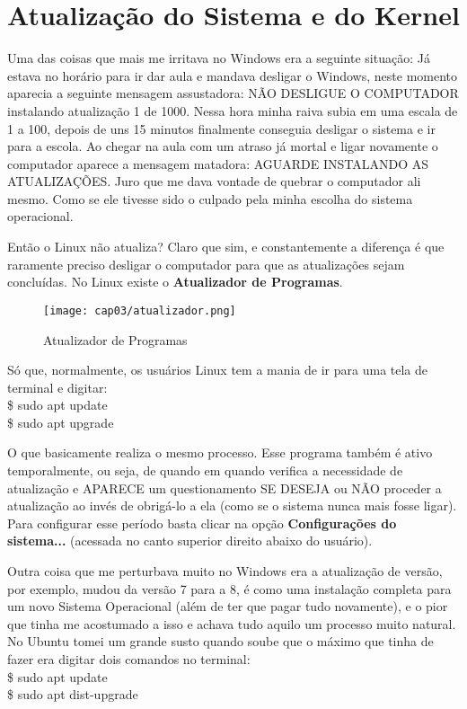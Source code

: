 \section{Atualização do Sistema e do Kernel}
Uma das coisas que mais me irritava no Windows era a seguinte situação: Já estava no horário para ir dar aula e mandava desligar o Windows, neste momento aparecia a seguinte mensagem assustadora: NÃO DESLIGUE O COMPUTADOR instalando atualização 1 de 1000. Nessa hora minha raiva subia em uma escala de 1 a 100, depois de uns 15 minutos finalmente conseguia desligar o sistema e ir para a escola. Ao chegar na aula com um atraso já mortal e ligar novamente o computador aparece a mensagem matadora: AGUARDE INSTALANDO AS ATUALIZAÇÕES. Juro que me dava vontade de quebrar o computador ali mesmo. Como se ele tivesse sido o culpado pela minha escolha do sistema operacional.

Então o Linux não atualiza? Claro que sim, e constantemente a diferença é que raramente preciso desligar o computador para que as atualizações sejam concluídas. No Linux existe o \textbf{Atualizador de Programas}.
\begin{figure}[H]
\centering\texttt{[image: cap03/atualizador.png]}
\caption{Atualizador de Programas}
\end{figure}

Só que, normalmente, os usuários Linux tem a mania de ir para uma tela de terminal e digitar: \\
{\ttfamily\$ sudo apt update} \\
{\ttfamily\$ sudo apt upgrade}

O que basicamente realiza o mesmo processo. Esse programa também é ativo temporalmente, ou seja, de quando em quando verifica a necessidade de atualização e APARECE um questionamento SE DESEJA ou NÃO proceder a atualização ao invés de obrigá-lo a ela (como se o sistema nunca mais fosse ligar). Para configurar esse período basta clicar na opção \textbf{Configurações do sistema...} (acessada no canto superior direito abaixo do usuário).

Outra coisa que me perturbava muito no Windows era a atualização de versão, por exemplo, mudou da versão 7 para a 8, é como uma instalação completa para um novo Sistema Operacional (além de ter que pagar tudo novamente), e o pior que tinha me acostumado a isso e achava tudo aquilo um processo muito natural. No Ubuntu tomei um grande susto quando soube que o máximo que tinha de fazer era digitar dois comandos no terminal: \\
{\ttfamily\$ sudo apt update} \\
{\ttfamily\$ sudo apt dist-upgrade}

